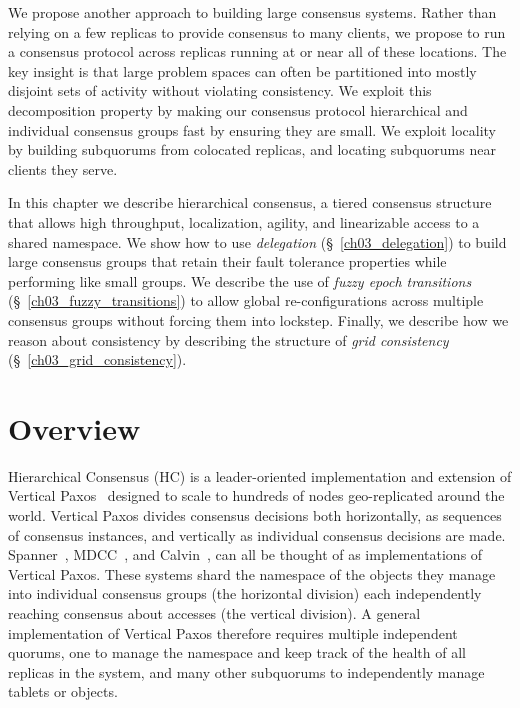 We propose another approach to building large consensus systems.
Rather than relying on a few replicas to provide consensus to many clients, we propose to run a consensus protocol across replicas running at or near all of these locations.
The key insight is that large problem spaces can often be partitioned into mostly disjoint sets of activity without violating consistency.
We exploit this decomposition property by making our consensus protocol hierarchical and individual consensus groups fast by ensuring they are small.
We exploit locality by building subquorums from colocated replicas, and locating subquorums near clients they serve.

In this chapter we describe hierarchical consensus, a tiered consensus structure that allows high throughput, localization, agility, and linearizable access to a shared namespace.
We show how to use \emph{delegation} (\S~\ref{ch03_delegation})  to build large consensus groups that retain their fault tolerance properties while performing like small groups.
We describe the use of \emph{fuzzy epoch transitions} (\S~\ref{ch03_fuzzy_transitions}) to allow global re-configurations across multiple consensus groups without forcing them into lockstep.
Finally, we describe how we reason about consistency by describing the structure of \emph{grid consistency} (\S~\ref{ch03_grid_consistency}).

\section{Overview}
\label{ch03_overview}

Hierarchical Consensus (HC) is a leader-oriented implementation and extension of Vertical Paxos~\cite{vertical_paxos,boxwood,niobe} designed to scale to hundreds of nodes geo-replicated around the world.
Vertical Paxos divides consensus decisions both horizontally, as sequences of consensus instances, and vertically as individual consensus decisions are made.
Spanner~\cite{spanner}, MDCC~\cite{mdcc}, and Calvin~\cite{calvindb}, can all be thought of as implementations of Vertical Paxos.
These systems shard the namespace of the objects they manage into individual consensus groups (the horizontal division) each independently reaching consensus about accesses (the vertical division).
A general implementation of Vertical Paxos therefore requires multiple independent quorums, one to manage the namespace and keep track of the health of all replicas in the system, and many other subquorums to independently manage tablets or objects.

